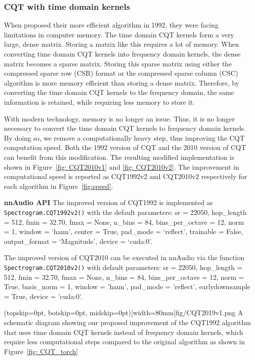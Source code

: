 \documentclass{ieeeaccess}
\newcommand{\nbh}[1]{\texttt{#1}}
\begin{document}
\subsubsection{CQT with time domain kernels}
\label{subsec:CQTv2}
When \citet{brown1992efficient} proposed their more efficient algorithm in 1992, they were facing limitations in computer memory. The time domain CQT kernels form a very large, dense matrix. Storing a matrix like this requires a lot of memory. When converting time domain CQT kernels into frequency domain kernels, the dense matrix becomes a sparse matrix. Storing this sparse matrix using either the compressed sparse row (CSR) format or the compressed sparse column (CSC) algorithm is more memory efficient than storing a dense matrix. Therefore, by converting the time domain CQT kernels to the frequency domain, the same information is retained, while requiring less memory to store it.

With modern technology, memory is no longer an issue. Thus, it is no longer necessary to convert the time domain CQT kernels to frequency domain kernels. By doing so, we remove a computationally heavy step, thus improving the CQT computation speed. Both the 1992 version of CQT and the 2010 version of CQT can benefit from this modification. The resulting modified implementation is shown in Figure~\ref{fig: CQT2010v1} and \ref{fig: CQT2010v2}. The improvement in computational speed is reported as CQT1992v2 and CQT2010v2 respectively for each algorithm in Figure~\ref{fig:speed}.



\hspace{11pt} 

\noindent \textbf{nnAudio API} The improved version of CQT1992 is implemented as \nbh{Spectrogram.CQT1992v2()} with the default parameters: sr = 22050, hop\_length = 512, fmin = 32.70, fmax = None, n\_bins = 84, bins\_per\_octave = 12, norm = 1, window = `hann', center = True, pad\_mode = `reflect', trainable = False, output\_format = `Magnitude', device = `cuda:0'. 

The improved version of CQT2010 can be executed in nnAudio via the function \nbh{Spectrogram.CQT2010v2()} with default parameters: sr = 22050, hop\_length = 512, fmin = 32.70, fmax = None, n\_bins = 84, bins\_per\_octave = 12, norm = True, basis\_norm = 1, window = 'hann', pad\_mode = 'reflect', earlydownsample = True, device = 'cuda:0'.

\Figure(topskip=0pt, botskip=0pt, midskip=0pt)[width=80mm]{fig/CQT2019v1.png}
{A schematic diagram showing our proposed improvement of the CQT1992 algorithm that uses time domain CQT kernels instead of frequency domain kernels, which require less computational steps compared to the original algorithm as shown in Figure~\ref{fig: CQT_torch}\label{fig: CQT2010v1}}
\end{document}

